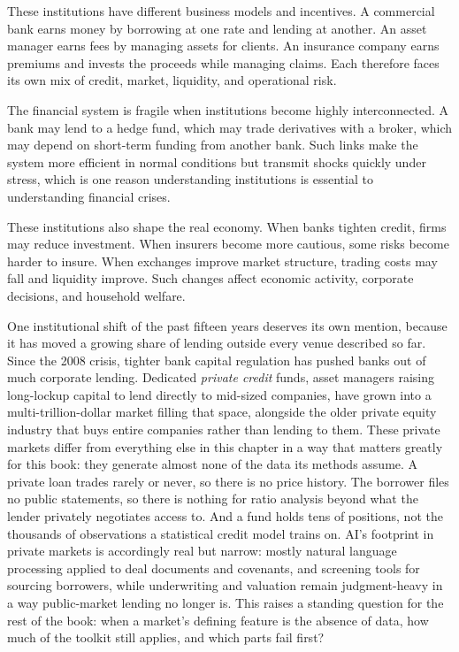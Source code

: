 \documentclass[../ai_in_finance]{subfiles}
\begin{document}
These institutions have different business models and incentives. A commercial bank earns money by borrowing at one rate and lending at another. An asset manager earns fees by managing assets for clients. An insurance company earns premiums and invests the proceeds while managing claims. Each therefore faces its own mix of credit, market, liquidity, and operational risk.

The financial system is fragile when institutions become highly interconnected. A bank may lend to a hedge fund, which may trade derivatives with a broker, which may depend on short-term funding from another bank. Such links make the system more efficient in normal conditions but transmit shocks quickly under stress, which is one reason understanding institutions is essential to understanding financial crises.

These institutions also shape the real economy. When banks tighten credit, firms may reduce investment. When insurers become more cautious, some risks become harder to insure. When exchanges improve market structure, trading costs may fall and liquidity improve. Such changes affect economic activity, corporate decisions, and household welfare.

One institutional shift of the past fifteen years deserves its own mention, because it has moved a growing share of lending outside every venue described so far. Since the 2008 crisis, tighter bank capital regulation has pushed banks out of much corporate lending. Dedicated \emph{private credit} funds, asset managers raising long-lockup capital to lend directly to mid-sized companies, have grown into a multi-trillion-dollar market filling that space, alongside the older private equity industry that buys entire companies rather than lending to them. These private markets differ from everything else in this chapter in a way that matters greatly for this book: they generate almost none of the data its methods assume. A private loan trades rarely or never, so there is no price history. The borrower files no public statements, so there is nothing for ratio analysis beyond what the lender privately negotiates access to. And a fund holds tens of positions, not the thousands of observations a statistical credit model trains on. AI's footprint in private markets is accordingly real but narrow: mostly natural language processing applied to deal documents and covenants, and screening tools for sourcing borrowers, while underwriting and valuation remain judgment-heavy in a way public-market lending no longer is. This raises a standing question for the rest of the book: when a market's defining feature is the absence of data, how much of the toolkit still applies, and which parts fail first?
\end{document}
